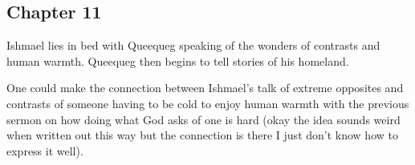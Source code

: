 \subsection{Chapter 11}

Ishmael lies in bed with Queequeg speaking of the wonders of contrasts and
human warmth. Queequeg then begins to tell stories of his homeland.

One could make the connection between Ishmael's talk of extreme opposites and
contrasts of someone having to be cold to enjoy human warmth with the previous
sermon on how doing what God asks of one is hard (okay the idea sounds weird
when written out this way but the connection is there I just don't know how to
express it well).
